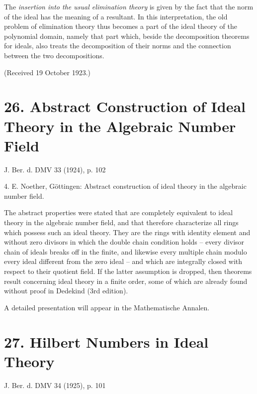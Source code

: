 \documentclass[11pt]{article}
\begin{document}
The \emph{insertion into the usual elimination theory} is given by the fact that the norm of the ideal has the meaning of a resultant. In this interpretation, the old problem of elimination theory thus becomes a part of the ideal theory of the polynomial domain, namely that part which, beside the decomposition theorems for ideals, also treats the decomposition of their norms and the connection between the two decompositions.

\begin{center}
(Received 19 October 1923.)
\end{center}

\section*{26. Abstract Construction of Ideal Theory in the Algebraic Number Field}

\begin{center}
J. Ber. d. DMV 33 (1924), p. 102
\end{center}

4. E. Noether, Göttingen: Abstract construction of ideal theory in the algebraic number field.

The abstract properties were stated that are completely equivalent to ideal theory in the algebraic number field, and that therefore characterize all rings which possess such an ideal theory. They are the rings with identity element and without zero divisors in which the double chain condition holds -- every divisor chain of ideals breaks off in the finite, and likewise every multiple chain modulo every ideal different from the zero ideal -- and which are integrally closed with respect to their quotient field. If the latter assumption is dropped, then theorems result concerning ideal theory in a finite order, some of which are already found without proof in Dedekind (3rd edition).

A detailed presentation will appear in the Mathematische Annalen.

\section*{27. Hilbert Numbers in Ideal Theory}

\begin{center}
J. Ber. d. DMV 34 (1925), p. 101
\end{center}
\end{document}
